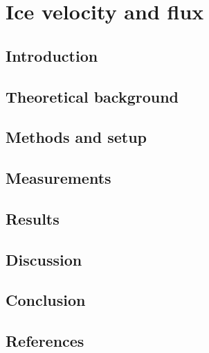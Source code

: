 

\renewcommand{\chapterauthor}{Julien, Linda, Moritz}
\chapter{Ice velocity and flux}
\label{icevel}

\begin{abstract}

\end{abstract}


\section{Introduction}


\section{Theoretical background}


\section{Methods and setup}


\section{Measurements}


\section{Results}


\section{Discussion}


\section{Conclusion}


\newpage
\section*{References}


